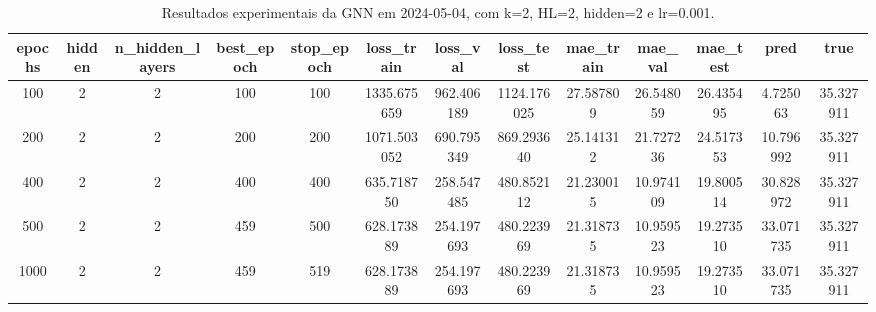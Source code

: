 \begin{table}[h]
\centering
\caption{Resultados experimentais da GNN em 2024-05-04, com k=2, HL=2, hidden=2 e lr=0.001.}
\label{tab:gnn_results_k2_hl2_h2_d20240504}
\begin{tabular}{ccccccccccccc}
\toprule
epochs & hidden & n\_hidden\_layers & best\_epoch & stop\_epoch & loss\_train & loss\_val & loss\_test & mae\_train & mae\_val & mae\_test & pred & true \\
\midrule
100 & 2 & 2 & 100 & 100 & 1335.675659 & 962.406189 & 1124.176025 & 27.587809 & 26.548059 & 26.435495 & 4.725063 & 35.327911 \\
200 & 2 & 2 & 200 & 200 & 1071.503052 & 690.795349 & 869.293640 & 25.141312 & 21.727236 & 24.517353 & 10.796992 & 35.327911 \\
400 & 2 & 2 & 400 & 400 & 635.718750 & 258.547485 & 480.852112 & 21.230015 & 10.974109 & 19.800514 & 30.828972 & 35.327911 \\
500 & 2 & 2 & 459 & 500 & 628.173889 & 254.197693 & 480.223969 & 21.318735 & 10.959523 & 19.273510 & 33.071735 & 35.327911 \\
1000 & 2 & 2 & 459 & 519 & 628.173889 & 254.197693 & 480.223969 & 21.318735 & 10.959523 & 19.273510 & 33.071735 & 35.327911 \\
\bottomrule
\end{tabular}
\end{table}
